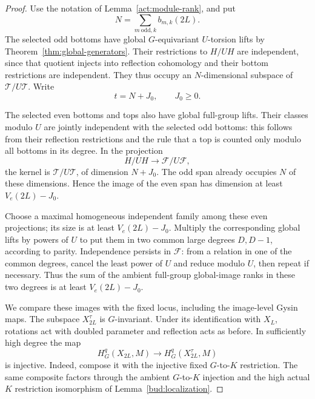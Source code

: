 \begin{proof}
Use the notation of Lemma~\ref{act:module-rank}, and put
\[
 N=\sum_{m\ \mathrm{odd},k} b_{m,k}(2L).
\]
The selected odd bottoms have global $G$-equivariant $U$-torsion lifts
by Theorem~\ref{thm:global-generators}. Their restrictions to $H/UH$
are independent, since that quotient injects into reflection cohomology
and their bottom restrictions are independent. They thus occupy an
$N$-dimensional subspace of $\mathcal T/U\mathcal T$. Write
\begin{equation}\label{act:residual-torsion}
 t=N+J_0,\qquad J_0\ge0.
\end{equation}

The selected even bottoms and tops also have global full-group lifts.
Their classes modulo $U$ are jointly independent with the selected odd
bottoms: this follows from their reflection restrictions and the rule
that a top is counted only modulo all bottoms in its degree. In the
projection
\[
 H/UH\longrightarrow\mathcal F/U\mathcal F,
\]
the kernel is $\mathcal T/U\mathcal T$, of dimension $N+J_0$.
The odd span already occupies $N$ of these dimensions. Hence the image
of the even span has dimension at least $V_e(2L)-J_0$.

Choose a maximal homogeneous independent family among these even
projections; its size is at least $V_e(2L)-J_0$.
Multiply the corresponding global lifts by powers of $U$ to put them in
two common large degrees $D,D-1$, according to parity. Independence persists in
$\mathcal F$: from a relation in one of the common degrees, cancel
the least power of $U$ and reduce modulo $U$, then repeat if necessary.
Thus the sum of the ambient full-group global-image ranks in these
two degrees is at least $V_e(2L)-J_0$.

We compare these images with the fixed locus, including the image-level
Gysin maps. The subspace $X_{2L}^\tau$ is $G$-invariant. Under its
identification with $X_L$, rotations act with doubled parameter and
reflection acts as before. In sufficiently high degree the map
\[
 H_G^q(X_{2L},M)\longrightarrow H_G^q(X_{2L}^\tau,M)
\]
is injective. Indeed, compose it with the injective fixed $G$-to-$K$
restriction. The same composite factors through the ambient
$G$-to-$K$ injection and the high actual $K$ restriction isomorphism
of Lemma~\ref{bud:localization}.


\end{proof}
